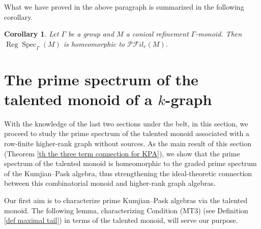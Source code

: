 \documentclass[a4paper,reqno,12pt]{amsart}
\numberwithin{equation}{section}
\newtheorem{cor}[thm]{Corollary}
\theoremstyle{definition}
\theoremstyle{remark}
\newcommand{\Spec}{\operatorname{Spec}}
\newcommand{\reg}{\operatorname{Reg}}
\begin{document}
What we have proved in the above paragraph is summarized in the following corollary.
\begin{cor}\label{cor regular prime order ideals}
Let $\Gamma$ be a group and $M$ a conical refinement $\Gamma$-monoid. Then $\reg\Spec_\Gamma(M)$ is homeomorphic to $\mathscr{P}\mathscr{F}il_r(M)$.     
\end{cor}

\section{The prime spectrum of the talented monoid of a \texorpdfstring{$k$}{k}-graph}\label{sec maximal tail and TM}
With the knowledge of the last two sections under the belt, in this section, we proceed to study the prime spectrum of the talented monoid associated with a row-finite higher-rank graph without sources. As the main result of this section (Theorem \ref{th the three term connection for KPA}), we show that the prime spectrum of the talented monoid is homeomorphic to the graded prime spectrum of the Kumjian--Pask algebra, thus strengthening the ideal-theoretic connection between this combinatorial monoid and higher-rank graph algebras.  

Our first aim is to characterize prime Kumjian--Pask algebras via the talented monoid. The following lemma, characterizing Condition (MT3) (see Definition \ref{def maximal tail}) in terms of the talented monoid, will serve our purpose. 
\end{document}

